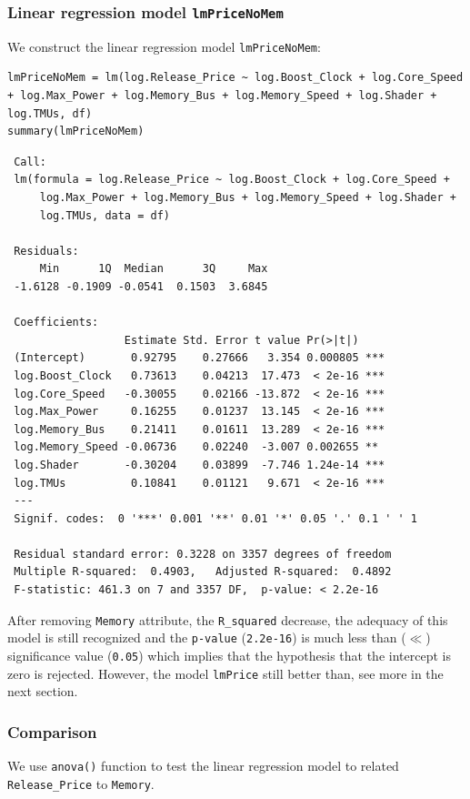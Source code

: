 \documentclass[a4paper]{article}
\begin{document}
\subsubsection{Linear regression model \texttt{lmPriceNoMem}}
We construct the linear regression model \verb|lmPriceNoMem|:
\begin{mdframed}[leftline=false,rightline=false,backgroundcolor=lightblue!10,nobreak=false]
    \begin{verbatim}
lmPriceNoMem = lm(log.Release_Price ~ log.Boost_Clock + log.Core_Speed + log.Max_Power + log.Memory_Bus + log.Memory_Speed + log.Shader + log.TMUs, df)
summary(lmPriceNoMem)
    \end{verbatim}
\end{mdframed}
\begin{lstlisting}
 Call:
 lm(formula = log.Release_Price ~ log.Boost_Clock + log.Core_Speed + 
     log.Max_Power + log.Memory_Bus + log.Memory_Speed + log.Shader + 
     log.TMUs, data = df)

 Residuals:
     Min      1Q  Median      3Q     Max 
 -1.6128 -0.1909 -0.0541  0.1503  3.6845  

 Coefficients:
                  Estimate Std. Error t value Pr(>|t|)    
 (Intercept)       0.92795    0.27666   3.354 0.000805 ***
 log.Boost_Clock   0.73613    0.04213  17.473  < 2e-16 ***
 log.Core_Speed   -0.30055    0.02166 -13.872  < 2e-16 ***
 log.Max_Power     0.16255    0.01237  13.145  < 2e-16 ***
 log.Memory_Bus    0.21411    0.01611  13.289  < 2e-16 ***
 log.Memory_Speed -0.06736    0.02240  -3.007 0.002655 ** 
 log.Shader       -0.30204    0.03899  -7.746 1.24e-14 ***
 log.TMUs          0.10841    0.01121   9.671  < 2e-16 ***
 ---
 Signif. codes:  0 '***' 0.001 '**' 0.01 '*' 0.05 '.' 0.1 ' ' 1

 Residual standard error: 0.3228 on 3357 degrees of freedom
 Multiple R-squared:  0.4903,	Adjusted R-squared:  0.4892 
 F-statistic: 461.3 on 7 and 3357 DF,  p-value: < 2.2e-16
\end{lstlisting}
After removing \verb|Memory| attribute, the \verb|R_squared| decrease, the adequacy of this model is still recognized and the \verb|p-value| (\verb|2.2e-16|) is much less than ($\ll$) significance value (\verb|0.05|) which implies that the hypothesis that the intercept is zero is rejected. However, the model \verb|lmPrice| still better than, see more in the next section.
\subsubsection{Comparison}
We use \verb|anova()| function to test the linear regression model to related \verb|Release_Price| to \verb|Memory|.
\end{document}
